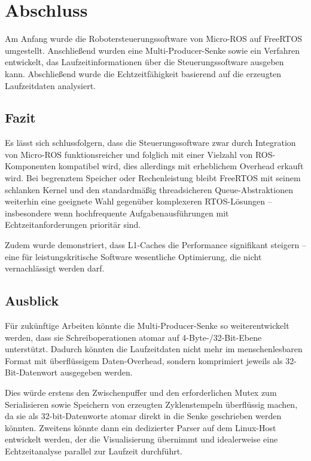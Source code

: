 \section{Abschluss}

Am Anfang wurde die Robotersteuerungssoftware von Micro-ROS auf FreeRTOS
umgestellt. Anschließend wurden eine Multi-Producer-Senke sowie ein Verfahren
entwickelt, das Laufzeitinformationen über die Steuerungssoftware ausgeben kann.
Abschließend wurde die Echtzeitfähigkeit basierend auf die erzeugten
Laufzeitdaten analysiert.

\subsection{Fazit}

Es lässt sich schlussfolgern, dass die Steuerungssoftware zwar durch Integration
von Micro-ROS funktionsreicher und folglich mit einer Vielzahl von
ROS-Komponenten kompatibel wird, dies allerdings mit erheblichem Overhead
erkauft wird. Bei begrenztem Speicher oder Rechenleistung bleibt FreeRTOS mit
seinem schlanken Kernel und den standardmäßig threadsicheren Queue-Abstraktionen
weiterhin eine geeignete Wahl gegenüber komplexeren RTOS-Lösungen --
insbesondere wenn hochfrequente Aufgabenausführungen mit Echtzeitanforderungen
prioritär sind.

Zudem wurde demonstriert, dass L1-Caches die Performance signifikant steigern --
eine für leistungskritische Software wesentliche Optimierung, die nicht
vernachlässigt werden darf.

\subsection{Ausblick}

Für zukünftige Arbeiten könnte die Multi-Producer-Senke so weiterentwickelt
werden, dass sie Schreiboperationen atomar auf 4-Byte-/32-Bit-Ebene unterstützt.
Dadurch könnten die Laufzeitdaten nicht mehr im menschenlesbaren Format mit
überflüssigem Daten-Overhead, sondern komprimiert jeweils als 32-Bit-Datenwort
ausgegeben werden.

Dies würde erstens den Zwischenpuffer und den erforderlichen Mutex zum
Serialisieren sowie Speichern von erzeugten Zyklenstempeln überflüssig machen,
da sie als 32-bit-Datenworte atomar direkt in die Senke geschrieben werden
könnten. Zweitens könnte dann ein dedizierter Parser auf dem Linux-Host
entwickelt werden, der die Visualisierung übernimmt und idealerweise eine
Echtzeitanalyse parallel zur Laufzeit durchführt.

